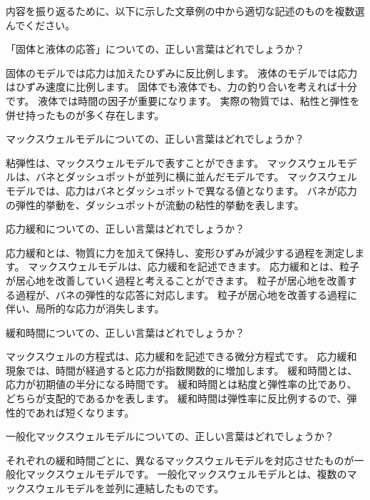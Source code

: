 \documentclass[uplatex,dvipdfmx,a4paper,11pt]{jsreport}
\begin{document}
\clearpage

内容を振り返るために、以下に示した文章例の中から適切な記述のものを複数選んでください。
\begin{qlist}
	\qitem 「固体と液体の応答」についての、正しい言葉はどれでしょうか？
		\begin{qlist2}
			\qitem 固体のモデルでは応力は加えたひずみに反比例します。
			\qitem 液体のモデルでは応力はひずみ速度に比例します。
			\qitem 固体でも液体でも、力の釣り合いを考えれば十分です。
			\qitem 液体では時間の因子が重要になります。
			\qitem 実際の物質では、粘性と弾性を併せ持ったものが多く存在します。
		\end{qlist2}
	\qitem マックスウェルモデルについての、正しい言葉はどれでしょうか？
		\begin{qlist2}
			\qitem 粘弾性は、マックスウェルモデルで表すことができます。
			\qitem マックスウェルモデルは、バネとダッシュポットが並列に横に並んだモデルです。
			\qitem マックスウェルモデルでは、応力はバネとダッシュポットで異なる値となります。
			\qitem バネが応力の弾性的挙動を、ダッシュポットが流動の粘性的挙動を表します。
		\end{qlist2}
	\qitem 応力緩和についての、正しい言葉はどれでしょうか？
		\begin{qlist2}
			\qitem 応力緩和とは、物質に力を加えて保持し、変形ひずみが減少する過程を測定します。
			\qitem マックスウェルモデルは、応力緩和を記述できます。
			\qitem 応力緩和とは、粒子が居心地を改善していく過程と考えることができます。
			\qitem 粒子が居心地を改善する過程が、バネの弾性的な応答に対応します。
			\qitem 粒子が居心地を改善する過程に伴い、局所的な応力が消失します。
		\end{qlist2}
	\qitem 緩和時間についての、正しい言葉はどれでしょうか？
		\begin{qlist2}
			\qitem マックスウェルの方程式は、応力緩和を記述できる微分方程式です。
			\qitem 応力緩和現象では、時間が経過すると応力が指数関数的に増加します。
			\qitem 緩和時間とは、応力が初期値の半分になる時間です。
			\qitem 緩和時間とは粘度と弾性率の比であり、どちらが支配的であるかを表します。
			\qitem 緩和時間は弾性率に反比例するので、弾性的であれば短くなります。
		\end{qlist2}
	\qitem 一般化マックスウェルモデルについての、正しい言葉はどれでしょうか？
		\begin{qlist2}
			\qitem それぞれの緩和時間ごとに、異なるマックスウェルモデルを対応させたものが一般化マックスウェルモデルです。
			\qitem 一般化マックスウェルモデルとは、複数のマックスウェルモデルを並列に連結したものです。

\end{qlist2}
\end{qlist}
\end{document}
